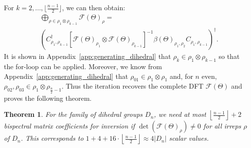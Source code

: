 \documentclass{article}
\theoremstyle{plain}
\newtheorem{theorem}{Theorem}[section]
\theoremstyle{definition}
\theoremstyle{remark}
\begin{document}
For $k=2,...,\lfloor \frac{n-1}{2}\rfloor$, we can then obtain:
\begin{align}
    \label{eq:new_coeff_dihedral}
    &\bigoplus_{\rho\in\rho_1\otimes\rho_{k-1}}\mathcal{F}(\Theta)_\rho =\\
    \nonumber
    &\left(C_{\rho_1,\rho_{k-1}}^{\dagger}\left[\mathcal{F}(\Theta)_{\rho_1}\otimes\mathcal{F}(\Theta)_{\rho_{k-1}}\right]^{-1}\beta(\Theta)_{\rho_1,\rho_2}C_{\rho_1,\rho_{k-1}}\right)^\dagger.
\end{align}
It is shown in Appendix~\ref{app:generating_dihedral} that $\rho_k\in\rho_1\otimes\rho_{k-1}$ so that the for-loop can be applied. Moreover, we know from Appendix~\ref{app:generating_dihedral} that $\rho_{01}\in\rho_1\otimes\rho_{1}$ and, for $n$ even, $\rho_{02}, \rho_{03}\in \rho_1\otimes\rho_{\frac{n}{2}-1}$. Thus the iteration recovers the complete DFT $\mathcal{F}(\Theta)$ and proves the following theorem.

\begin{theorem}
    For the family of dihedral groups $D_n$, we need at most $\left \lfloor{ \frac{n-1}{2}}\right \rfloor + 2$ bispectral matrix coefficients for inversion if $\det(\mathcal{F}(\Theta)_\rho) \neq 0$ for all irreps $\rho$ of $D_n$. This corresponds to $1+4+16\cdot\left\lfloor{ \frac{n-1}{2}}\right \rfloor\approx 4 |D_n|$ scalar values.
\end{theorem}
\end{document}
